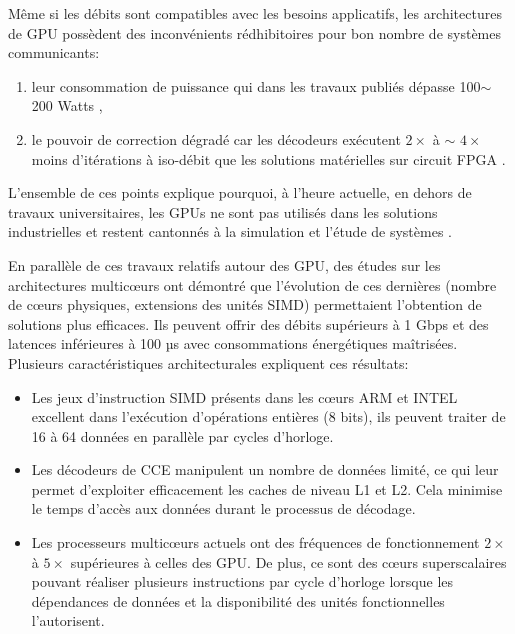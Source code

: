 \documentclass[../main.tex]{subfiles}
\begin{document}
Même si les débits sont compatibles avec les besoins applicatifs, les architectures de GPU possèdent des inconvénients rédhibitoires pour bon nombre de systèmes communicants:
\begin{enumerate}
    \item leur consommation de puissance qui dans les travaux publiés dépasse 100$\sim$200 Watts \cite{BLG:GPU},
    \item le pouvoir de correction dégradé car les décodeurs exécutent $2\times$ à $\sim$ $4\times$ moins d’itérations à iso-débit que les solutions matérielles sur circuit FPGA \cite{FALCAO:SURVEY}.
\end{enumerate}
L’ensemble de ces points explique pourquoi, à l’heure actuelle, en dehors de travaux universitaires, les GPUs ne sont pas utilisés dans les solutions industrielles \cite{OpenAirInterface,INTEL:FLEXRAN} et restent cantonnés à la simulation et l’étude de systèmes \cite{NVIDIA:CNN:COM:NUM}.

En parallèle de ces travaux relatifs autour des GPU, des études sur les architectures multicœurs ont démontré que l’évolution de ces dernières (nombre de cœurs physiques, extensions des unités SIMD) permettaient l’obtention de solutions plus efficaces. Ils peuvent offrir des débits supérieurs à 1 Gbps et des latences inférieures à 100 µs avec consommations énergétiques maîtrisées. Plusieurs caractéristiques architecturales expliquent ces résultats:

\begin{itemize}
    \item Les jeux d’instruction SIMD présents dans les cœurs ARM et INTEL excellent dans l’exécution d’opérations entières (8 bits), ils peuvent traiter de 16 à 64 données en parallèle par cycles d’horloge. 
    \item Les décodeurs de CCE manipulent un nombre de données limité, ce qui leur permet d’exploiter efficacement les caches de niveau L1 et L2. Cela minimise le temps d’accès aux données durant le processus de décodage.
    \item Les processeurs multicœurs actuels ont des fréquences de fonctionnement $2\times$ à $5\times$ supérieures à celles des GPU. De plus, ce sont des cœurs superscalaires pouvant réaliser plusieurs instructions par cycle d’horloge lorsque les dépendances de données et la disponibilité des unités fonctionnelles l’autorisent.
\end{itemize}
\end{document}
